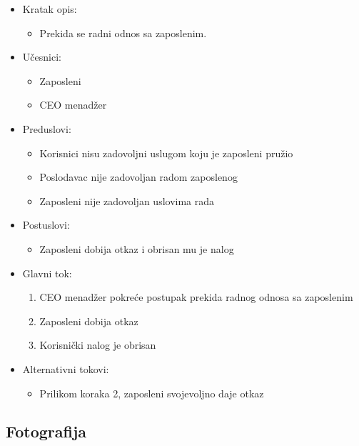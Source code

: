 \documentclass[a4paper]{article}
\begin{document}
\begin{itemize}
    \item Kratak opis: 
    \begin{itemize}
        \item Prekida se radni odnos sa zaposlenim.
    \end{itemize}
    \item Učesnici:
        \begin{itemize}
        \item Zaposleni
        \item CEO menadžer
    \end{itemize}
    \item Preduslovi:
        \begin{itemize}
            \item Korisnici nisu zadovoljni uslugom koju je zaposleni pružio
            \item Poslodavac nije zadovoljan radom zaposlenog
            \item Zaposleni nije zadovoljan uslovima rada
        \end{itemize}
    \item Postuslovi:
        \begin{itemize}
            \item Zaposleni dobija otkaz i obrisan mu je nalog
        \end{itemize}
    \item Glavni tok:
        \begin{enumerate}
            \item CEO menadžer pokreće postupak prekida radnog odnosa sa zaposlenim
            \item Zaposleni dobija otkaz
            \item Korisnički nalog je obrisan
        \end{enumerate}
    \item Alternativni tokovi:
        \begin{itemize}
            \item Prilikom koraka 2, zaposleni svojevoljno daje otkaz
        \end{itemize}
\end{itemize}



\subsection{Fotografija}
\end{document}
